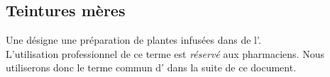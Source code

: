 \subsection{Teintures mères}

\begin{Defi}
    Une  désigne une préparation de plantes infusées dans de l'. \\
    L'utilisation professionnel de ce terme est \textit{réservé} aux pharmaciens. Nous utiliserons donc le terme commun d' dans la suite de ce document.
\end{Defi}